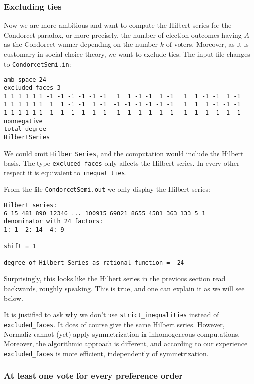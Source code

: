 \documentclass[12pt,a4paper]{scrartcl}
\theoremstyle{definition}
\begin{document}
\subsubsection{Excluding ties}\label{excluded_ex}

Now we are more ambitious and want to compute the Hilbert series for the Condorcet paradox, or more precisely, the number of election outcomes having $A$ as the Condorcet winner depending on the number $k$ of voters. Moreover, as it is customary in social choice theory, we want to exclude ties. The input file changes to \verb|CondorcetSemi.in|:
\begin{Verbatim}
amb_space 24
excluded_faces 3
1 1 1 1 1 1 -1 -1 -1 -1 -1 -1   1  1 -1 -1  1 -1   1  1 -1 -1  1 -1
1 1 1 1 1 1  1  1 -1 -1  1 -1  -1 -1 -1 -1 -1 -1   1  1  1 -1 -1 -1
1 1 1 1 1 1  1  1  1 -1 -1 -1   1  1  1 -1 -1 -1  -1 -1 -1 -1 -1 -1
nonnegative
total_degree
HilbertSeries
\end{Verbatim}
We could omit \verb|HilbertSeries|, and the computation would include the Hilbert basis. The type \verb|excluded_faces| only affects the Hilbert series. In every other respect it is equivalent to \verb|inequalities|.

From the file \verb|CondorcetSemi.out| we only display the Hilbert series:
\begin{Verbatim}
Hilbert series:
6 15 481 890 12346 ... 100915 69821 8655 4581 363 133 5 1 
denominator with 24 factors:
1: 1  2: 14  4: 9  

shift = 1

degree of Hilbert Series as rational function = -24
\end{Verbatim}
Surprisingly, this looks like the Hilbert series in the previous section read backwards, roughly speaking. This is true, and one can explain it as we will see below. 

It is justified to ask why we don't use \verb|strict_inequalities| instead of \verb|excluded_faces|. It does of course give the same Hilbert series. However, Normaliz cannot (yet) apply symmetrization in inhomogeneous computations. Moreover, the algorithmic approach is different, and according to our experience \verb|excluded_faces| is more efficient, independently of symmetrization. 

\subsubsection{At least one vote for every preference order}\label{strict_signs_ex}
\end{document}
